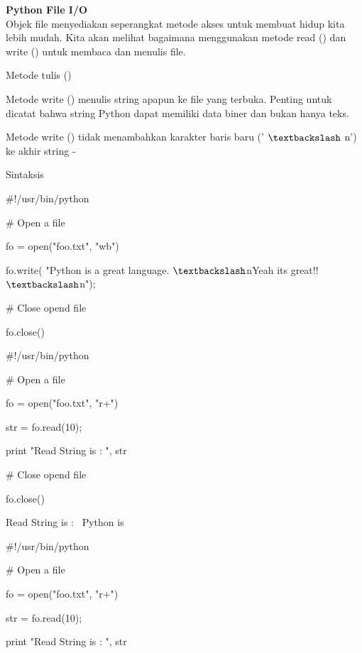 \begin{center}{\fontsize{24pt}{24pt}\selectfont \textbf{Python File I/O} \\}
Objek file menyediakan seperangkat metode akses untuk membuat hidup kita lebih mudah. Kita akan melihat bagaimana menggunakan metode read () dan write () untuk membaca dan menulis file. 

Metode tulis () 
\vspace{12pt}

Metode write () menulis string apapun ke file yang terbuka. Penting untuk dicatat bahwa string Python dapat memiliki data biner dan bukan hanya teks. 
\vspace{12pt}

Metode write () tidak menambahkan karakter baris baru (' $  \textbackslash  $ n') ke akhir string - 

Sintaksis 
\vspace{12pt}
 
 $  \#  $!/usr/bin/python 
\vspace{12pt}

 $  \#  $ Open a file 
 
fo = open("foo.txt", "wb") 

fo.write( "Python is a great language. $  \textbackslash  $nYeah its great!! $  \textbackslash  $n"); 
\vspace{12pt}

 $  \#  $ Close opend file 
 
fo.close() 

 $  \#  $!/usr/bin/python 
\vspace{12pt}

 $  \#  $ Open a file 
 
fo = open("foo.txt", "r+") 

str = fo.read(10); 

print "Read String is : ", str 
\vspace{12pt}

 $  \#  $ Close opend file
 
fo.close() 
\vspace{12pt}
 
Read String is :~ Python is 
\vspace{16pt}
 
 $  \#  $!/usr/bin/python 
\vspace{12pt}

 $  \#  $ Open a file 
 
fo = open("foo.txt", "r+") 

str = fo.read(10); 

print "Read String is : ", str 
\vspace{12pt}
 

\end{center}
